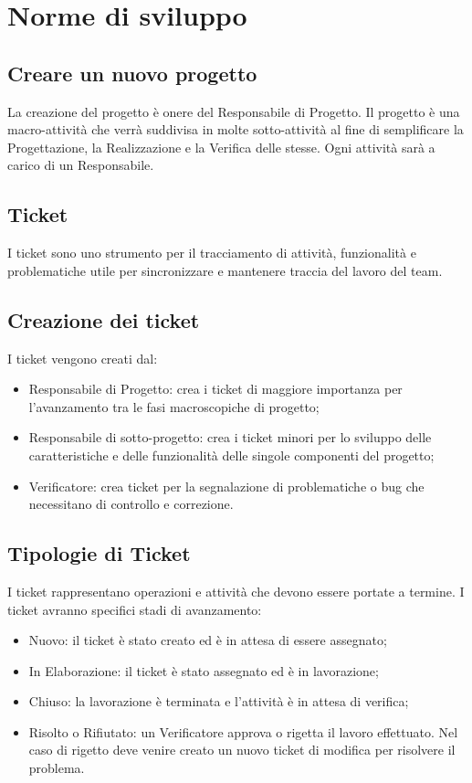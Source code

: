 \newpage
\section{Norme di sviluppo}
\label{8.0}

\subsection{Creare un nuovo progetto}
\label{8.1}
La creazione del progetto è onere del Responsabile di Progetto.
Il progetto è una macro-attività che verrà suddivisa in molte sotto-attività al fine di semplificare la Progettazione, la Realizzazione e la Verifica delle stesse. Ogni attività sarà a carico di un Responsabile.

\subsection{Ticket}
\label{8.2}
I ticket sono uno strumento per il tracciamento di attività, funzionalità e problematiche utile per sincronizzare e mantenere traccia del lavoro del team.

\subsection{Creazione dei ticket}
\label{8.3}
I ticket vengono creati dal:
\begin{itemize}
\item Responsabile di Progetto: crea i ticket di maggiore importanza per l'avanzamento tra le fasi macroscopiche di progetto;
\item Responsabile di sotto-progetto: crea i ticket minori per lo sviluppo delle caratteristiche e delle funzionalità delle singole componenti del progetto;
\item Verificatore: crea ticket per la segnalazione di problematiche o bug che necessitano di controllo e correzione.
\end{itemize}

\subsection{Tipologie di Ticket}
\label{8.4}
I ticket rappresentano operazioni e attività che devono essere portate a termine.
I ticket avranno specifici stadi di avanzamento:
\begin{itemize}
\item Nuovo: il ticket è stato creato ed è in attesa di essere assegnato;
\item In Elaborazione: il ticket è stato assegnato ed è in lavorazione;
\item Chiuso: la lavorazione è terminata e l'attività è in attesa di verifica;
\item Risolto o Rifiutato: un Verificatore approva o rigetta il lavoro effettuato. Nel caso di rigetto deve venire creato un nuovo ticket di modifica per risolvere il problema.
\end{itemize}

